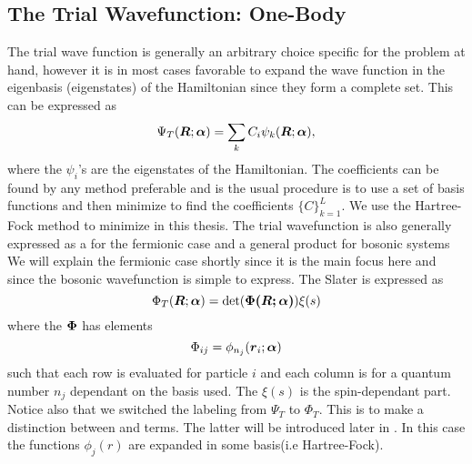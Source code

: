     \subsection{The Trial Wavefunction: One-Body}
        The trial wave function is generally an arbitrary choice specific for
        the problem at hand, however it is in most cases favorable to expand
        the wave function in the eigenbasis (eigenstates) of the Hamiltonian
        since they form a complete set. This can be expressed as
            \begin{equation}
                {\Psi}_T(\boldsymbol{{R}};\boldsymbol{{\alpha}}) = \sum_k C_i\psi_k(\boldsymbol{{R}};\boldsymbol{{\alpha}}),
            \end{equation}
        where the $\psi_i$'s are the eigenstates of the Hamiltonian. The
        coefficients can be found by any method preferable and is the usual
        procedure is to use a set of basis functions and then minimize to find
        the coefficients $\{C\}_{k=1}^L$. We use the Hartree-Fock method to
        minimize in this thesis. The trial wavefunction is also generally
        expressed as a  for the fermionic case and a
        general product for bosonic systems\cite{GriffQuan, NeOr, FeWa, DiVNe}
        We will explain the fermionic case shortly since it is the main focus
        here and since the bosonic wavefunction is simple to express. The
        Slater is expressed as
            \begin{equation}
                {\Phi}_T(\boldsymbol{{R}};\boldsymbol{{\alpha}}) = \det(\boldsymbol{{\Phi(\boldsymbol{{R}};\boldsymbol{{\alpha}})}}) \xi(s)
            \end{equation}
        where the  $\boldsymbol{{\Phi}}$ has elements
            \begin{equation}
                \Phi_{ij} = \phi_{n_j}(\boldsymbol{{r}}_i;\boldsymbol{{\alpha}})
            \end{equation}
        such that each row is evaluated for particle $i$ and each column is for
        a quantum number $n_j$ dependant on the basis used. The $\xi(s)$ is the
        spin-dependant part. Notice also that we switched the labeling from
        $\Psi_T$ to $\Phi_T$. This is to make a distinction between
         and  terms. The latter will be
        introduced later in . In this case the
         functions $\phi_j(r)$ are expanded in some
        basis(i.e Hartree-Fock).

